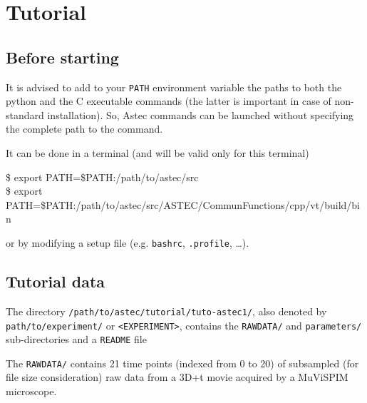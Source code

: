 \chapter{Tutorial}
\label{chap:tutorial}

\section*{Before starting}

It is advised to add to your \texttt{PATH} environment variable 
the paths to both the python and the C executable commands (the latter
is important in case of non-standard installation). So, Astec commands can be launched without specifying the complete path to the command.

It can be done in a terminal (and will be valid only for this terminal)
\begin{code}{0.8}
  \$ export PATH=\${PATH}:/path/to/astec/src \\
  \$ export PATH=\${PATH}:/path/to/astec/src/ASTEC/CommunFunctions/cpp/vt/build/bin
\end{code}
or by modifying a setup file (e.g. \texttt{bashrc}, \texttt{.profile}, \ldots).





\section{Tutorial data}

The directory \texttt{/path/to/astec/tutorial/tuto-astec1/}, also denoted by
\texttt{path/to/experiment/} or \texttt{<EXPERIMENT>}, contains
the \texttt{RAWDATA/} and \texttt{parameters/} sub-directories and a
\texttt{README} file

\mbox{}
\mbox{}

The \texttt{RAWDATA/} contains 21 time points (indexed from 0 to 20)
of subsampled (for file size
consideration) raw data from a 3D+t movie acquired by a MuViSPIM microscope.

\mbox{}
\mbox{}

